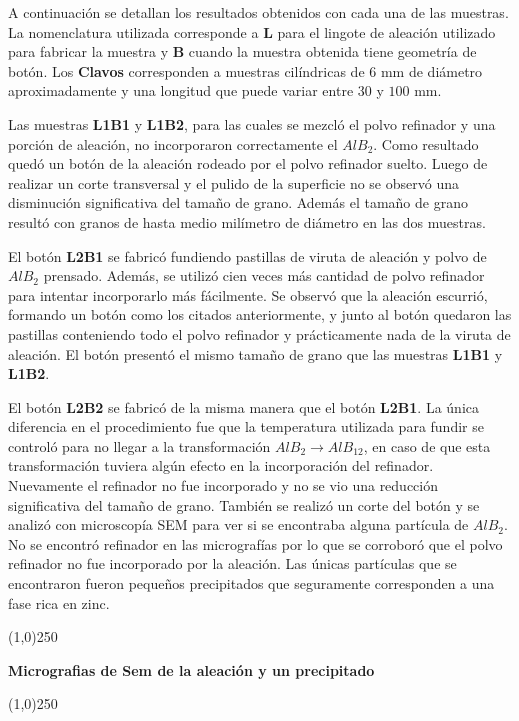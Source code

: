 \documentclass[a4paper,12pt,fleqn,twoside,openany]{book}
\begin{document}
A continuación se detallan los resultados obtenidos con cada una de las muestras. La nomenclatura utilizada corresponde a \textbf{L} para el lingote de aleación utilizado para fabricar la muestra y \textbf{B} cuando la muestra obtenida tiene geometría de botón. Los \textbf{Clavos} corresponden a muestras cilíndricas de $6$ mm de diámetro aproximadamente y una longitud que puede variar entre $30$ y $100$ mm.
 
 Las muestras \textbf{ L1B1} y \textbf{L1B2}, para las cuales se mezcló el polvo refinador y una porción de aleación, no incorporaron correctamente el $AlB_2$. Como resultado quedó un botón de la aleación rodeado por el polvo refinador suelto. Luego de realizar un corte transversal y el pulido de la superficie no se observó una disminución significativa del tamaño de grano. Además el tamaño de grano resultó con granos de hasta medio milímetro de diámetro en las dos muestras.  

El botón \textbf{L2B1} se fabricó fundiendo pastillas de viruta de aleación y polvo de $AlB_2$ prensado. Además, se utilizó cien veces más cantidad de polvo refinador para intentar incorporarlo más fácilmente. Se observó que la aleación escurrió, formando un botón como los citados anteriormente, y junto al botón quedaron las pastillas conteniendo todo el polvo refinador y prácticamente nada de la viruta de aleación. El botón presentó el mismo tamaño de grano que las muestras \textbf{ L1B1} y \textbf{L1B2}.

El botón \textbf{L2B2} se fabricó de la misma manera que el botón \textbf{L2B1}. La única diferencia en el procedimiento fue que la temperatura utilizada para fundir se controló para no llegar a la transformación $AlB_2 \rightarrow AlB_{12}$, en caso de que esta transformación tuviera algún efecto en la incorporación del refinador. Nuevamente el refinador no fue incorporado y no se vio una reducción significativa del tamaño de grano. También se realizó un corte del botón y se analizó con microscopía SEM para ver si se encontraba alguna partícula de $AlB_2$. No se encontró refinador en las micrografías por lo que se corroboró que el polvo refinador no fue incorporado por la aleación. Las únicas partículas que se encontraron fueron pequeños precipitados que seguramente corresponden a una fase rica en zinc.

\begin{center}
\line(1,0){250}
\end{center}
\textbf{Micrografias de Sem de la aleación y un precipitado}
\begin{center}
\line(1,0){250}
\end{center}
\end{document}
